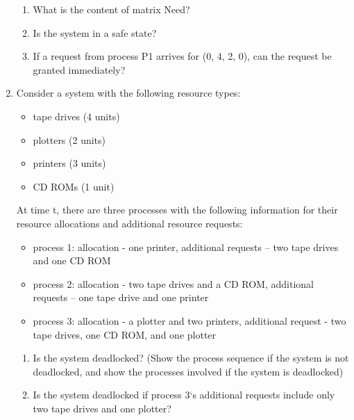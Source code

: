 \documentclass{article}
\begin{document}
\begin{enumerate}
\begin{table*}[h]
		\end{table*}
		\begin{enumerate}
			\item What is the content of matrix Need?
			\item Is the system in a safe state?
			\item If a request from process P1 arrives for (0, 4, 2, 0), can the request be granted immediately?
		\end{enumerate}
		\item Consider a system with the following resource types:
		\begin{itemize}
			\item tape drives (4 units)
			\item plotters (2 units)
			\item printers (3 units)
			\item CD ROMs (1 unit)
		\end{itemize}
		At time t, there are three processes with the following information for their resource allocations and additional resource requests:
		\begin{itemize}
			\item process 1: allocation - one printer, additional requests – two tape drives and one CD ROM
			\item process 2: allocation - two tape drives and a CD ROM, additional requests – one tape drive and one printer
			\item process 3: allocation - a plotter and two printers, additional request - two tape drives, one CD ROM, and one plotter
		\end{itemize}
		\begin{enumerate}
			\item Is the system deadlocked? (Show the process sequence if the system is not deadlocked, and show the processes involved if the system is deadlocked)
			\item Is the system deadlocked if process 3‘s additional requests include only two tape drives and one plotter?
		\end{enumerate}
	\end{enumerate}
\end{document}

